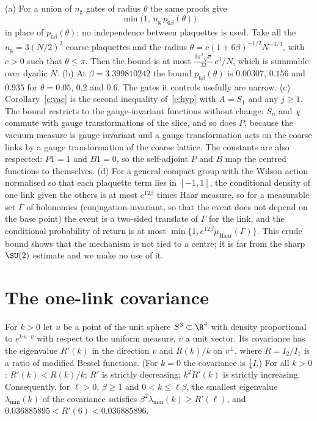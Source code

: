 \begin{remark}\label{r:ret}
(a) For a union of $n_{\mathrm g}$ gates of radius $\theta$ the same proofs give
\[\min\big(1,\,n_{\mathrm g}\,p_{6\beta}(\theta)\big)\]
in place of $p_{6\beta}(\theta)$; no independence between plaquettes is used. Take all the
$n_{\mathrm g}=3(N/2)^3$ coarse plaquettes and the radius $\theta=c(1+6\beta)^{-1/2}N^{-4/3}$, with $c>0$ such that
$\theta\le\pi$. Then the bound is at most $\tfrac{3\pi^2\sqrt e}{32}\,c^3/N$, which is summable over dyadic $N$.
(b) At $\beta=3.399810242$ the bound $p_{6\beta}(\theta)$ is $0.00307$, $0.156$ and $0.935$ for
$\theta=0.05$, $0.2$ and $0.6$. The gates it controls usefully are narrow. (c) Corollary~\ref{c:vac} is the
second inequality of~\eqref{e:hyp} with $A=S_1$ and any $j\ge1$. The bound restricts to the gauge-invariant functions without change: $S_n$ and $\chi$ commute with gauge
transformations of the slice, and so does $P$, because the vacuum measure is gauge invariant and a gauge
transformation acts on the coarse links by a gauge transformation of the coarse lattice. The constants are also respected: $P1=1$ and $B1=0$, so the self-adjoint $P$ and $B$ map the
centred functions to themselves. (d) For a general compact group with the Wilson action normalised so that each plaquette term lies in
$[-1,1]$, the conditional density of one link given the others is at most $e^{12\beta}$ times Haar measure,
so for a measurable set $\Gamma$ of holonomies (conjugation-invariant, so that the event does not depend on the
base point) the event is a two-sided translate of $\Gamma$ for the link, and the conditional probability of return
is at most $\min\{1,e^{12\beta}\mu_{\mathrm{Haar}}(\Gamma)\}$. This crude bound shows that the mechanism is not tied to a
centre; it is far from the sharp $\SU(2)$ estimate and we make no use of it.
\end{remark}

\section{The one-link covariance}\label{s:haar}
\begin{proposition}\label{p:haar}
For $k>0$ let $u$ be a point of the unit sphere $S^3\subset\R^4$ with density proportional to
$e^{k\,u\cdot v}$ with respect to the uniform measure, $v$ a unit vector. Its covariance has the eigenvalue
$R'(k)$ in the direction $v$ and $R(k)/k$ on $v^\perp$, where $R=I_2/I_1$ is a ratio of modified Bessel
functions. (For $k=0$ the covariance is $\tfrac14I$.) For all $k>0$: $R'(k)<R(k)/k$; $R'$ is strictly decreasing;
$k^2R'(k)$ is strictly increasing.
Consequently, for $\ell>0$, $\beta\ge1$ and $0<k\le\ell\beta$, the smallest eigenvalue $\lambda_{\min}(k)$ of the
covariance satisfies $\beta^2\lambda_{\min}(k)\ge R'(\ell)$, and $0.036885895<R'(6)<0.036885896$.
\end{proposition}

